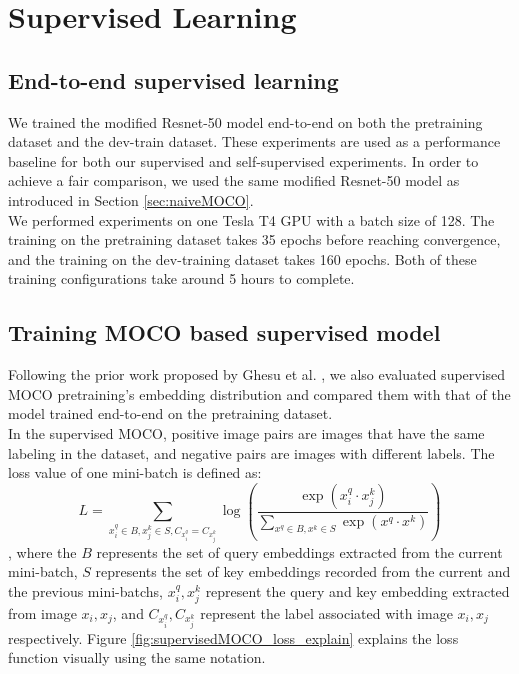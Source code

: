 \documentclass[12pt,twoside]{report}
\begin{document}
\section{Supervised Learning}
\subsection{End-to-end supervised learning} \label{sec:naive_supervised}
We trained the modified Resnet-50 model end-to-end on both the pretraining dataset and the dev-train dataset. These experiments are used as a performance baseline for both our supervised and self-supervised experiments. In order to achieve a fair comparison, we used the same modified Resnet-50 model as introduced in Section \ref{sec:naiveMOCO}. \\

We performed experiments on one Tesla T4 GPU with a batch size of 128. The training on the pretraining dataset takes 35 epochs before reaching convergence, and the training on the dev-training dataset takes 160 epochs. Both of these training configurations take around 5 hours to complete. 

\subsection{Training MOCO based supervised model}
Following the prior work proposed by Ghesu et al. \cite{selfsupervisedlearningfrom100}, we also evaluated supervised MOCO pretraining's embedding distribution and compared them with that of the model trained end-to-end on the pretraining dataset.\\

In the supervised MOCO, positive image pairs are images that have the same labeling in the dataset, and negative pairs are images with different labels. The loss value of one mini-batch is defined as:
$$L = \sum_{x_i^q \in B, x_j^k \in S, C_{x_i^q} = C_{x_j^k}}\log(\frac{\exp(x_i^q \cdot x_j^k)}{\sum_{x^q \in B, x^k \in S}\exp(x^q \cdot x^k)})$$
, where the $B$ represents the set of query embeddings extracted from the current mini-batch, $S$ represents the set of key embeddings recorded from the current and the previous mini-batchs, $x_i^q, x_j^k$ represent the query and key embedding extracted from image $x_i, x_j$, and $C_{x_i^q}, C_{x_j^k}$ represent the label associated with image $x_i, x_j$ respectively. Figure \ref{fig:supervisedMOCO_loss_explain} explains the loss function visually using the same notation.\\
\end{document}
